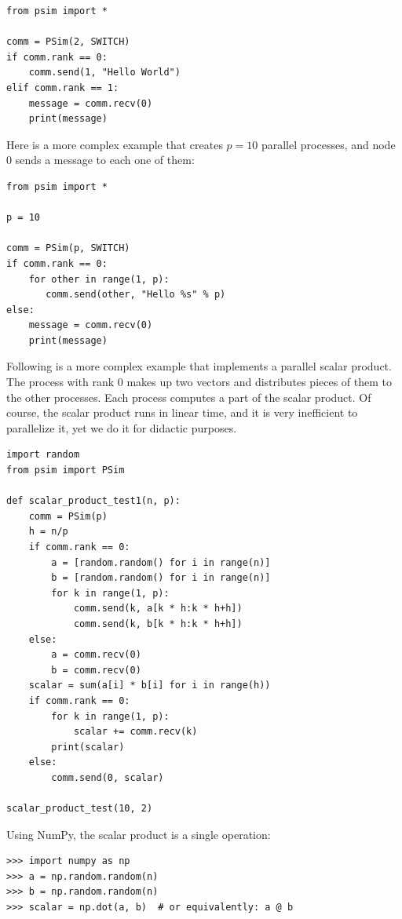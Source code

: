 \documentclass[justified, sixbynine]{tufte-book}
\def\ft{\small\tt}
\theoremstyle{plain}%
\newtheorem * {corollary}{Corollary}
\theoremstyle{definition}
\theoremstyle{remark}
\newtheorem * {remark}{Remark}
\newtheorem * {note}{Note}
\begin{document}
\begin{fullwidth}
\begin{lstlisting}
from psim import * 

comm = PSim(2, SWITCH)
if comm.rank == 0:
    comm.send(1, "Hello World")
elif comm.rank == 1:
    message = comm.recv(0)
    print(message)
\end{lstlisting}

Here is a more complex example that creates $p=10$ parallel processes, and node 0 sends a message to each one of them:


\begin{lstlisting}
from psim import * 

p = 10

comm = PSim(p, SWITCH)
if comm.rank == 0:
    for other in range(1, p):
       comm.send(other, "Hello %s" % p)
else:
    message = comm.recv(0)
    print(message)
\end{lstlisting}

 Following is a more complex example that implements a parallel scalar product. The process with rank 0 makes up two vectors and distributes pieces of them to the other processes. Each process computes a part of the scalar product. Of course, the scalar product runs in linear time, and it is very inefficient to parallelize it, yet we do it for didactic purposes.


\begin{lstlisting}[caption={in file: {\ft psim\_scalar.py}}]
import random
from psim import PSim

def scalar_product_test1(n, p):
    comm = PSim(p)
    h = n/p
    if comm.rank == 0:
        a = [random.random() for i in range(n)]
        b = [random.random() for i in range(n)]
        for k in range(1, p):
            comm.send(k, a[k * h:k * h+h])
            comm.send(k, b[k * h:k * h+h])
    else:
        a = comm.recv(0)
        b = comm.recv(0)
    scalar = sum(a[i] * b[i] for i in range(h))
    if comm.rank == 0:
        for k in range(1, p):
            scalar += comm.recv(k)
        print(scalar)
    else:
        comm.send(0, scalar)

scalar_product_test(10, 2)
\end{lstlisting}

Using NumPy, the scalar product is a single operation:

\begin{lstlisting}
>>> import numpy as np
>>> a = np.random.random(n)
>>> b = np.random.random(n)
>>> scalar = np.dot(a, b)  # or equivalently: a @ b
\end{lstlisting}


\end{fullwidth}
\end{document}
